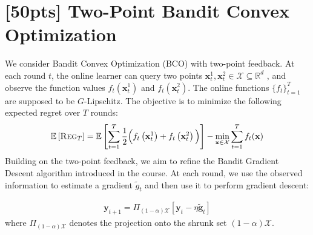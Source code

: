 \documentclass[a4paper]{article}
\numberwithin{equation}{section}
\theoremstyle{definition}
\theoremstyle{definition}
\def \E {\mathbb{E}}
\def \reg {\textsc{Reg}}
\begin{document}
\section{[50pts] Two-Point Bandit Convex Optimization}
\label{sec:TPBCO}
We consider Bandit Convex Optimization (BCO) with two-point feedback. At each round $t$, the online learner can query two points $\mathbf{x}_t^1, \mathbf{x}_t^2\in\mathcal{X}\subseteq \mathbb{R}^d$ , and observe the function values $f_t(\mathbf{x}_t^1)$ and $f_t(\mathbf{x}_t^2)$. The online functions $\{f_t\}_{t=1}^T$ are supposed to be $G$-Lipschitz. The objective is to minimize the following expected regret over $T$ rounds:
\begin{equation}\label{eq:two-regret}
  \E\left[\reg_T\right]=\E\left[\sum_{t=1}^T \frac{1}{2}\Big(f_t\left(\mathbf{x}_t^1\right)+f_t\left(\mathbf{x}_t^2\right)\Big)\right]-\min _{\mathbf{x} \in \mathcal{X}} \sum_{t=1}^T f_t(\mathbf{x})
\end{equation}
Building on the two-point feedback, we aim to refine the Bandit Gradient Descent algorithm introduced in the course. At each round, we use the observed information to estimate a gradient $\widetilde{g}_t$ and then use it to perform gradient descent:
\begin{tcolorbox}[top=-1pt]
  \begin{align*}
    \mathbf{y}_{t+1}=\Pi_{(1-\alpha) \mathcal{X}}\left[\mathbf{y}_t-\eta \widetilde{\mathbf{g}}_t\right]
  \end{align*}
  where $\Pi_{(1-\alpha) \mathcal{X}}$ denotes the projection onto the shrunk set $(1-\alpha)\mathcal{X}$. 
\end{tcolorbox}
\end{document}
